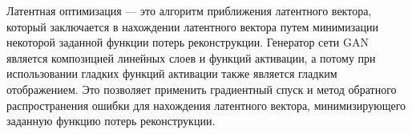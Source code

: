 Латентная оптимизация \cite{perarnau2016invertible} --- это алгоритм приближения латентного вектора, который заключается в нахождении латентного вектора путем минимизации некоторой заданной функции потерь реконструкции.
Генератор сети GAN является композицией линейных слоев и функций активации, а потому при использовании гладких функций активации также является гладким отображением.
Это позволяет применить градиентный спуск и метод обратного распространения ошибки для нахождения латентного вектора, минимизирующего заданную функцию потерь реконструкции.



